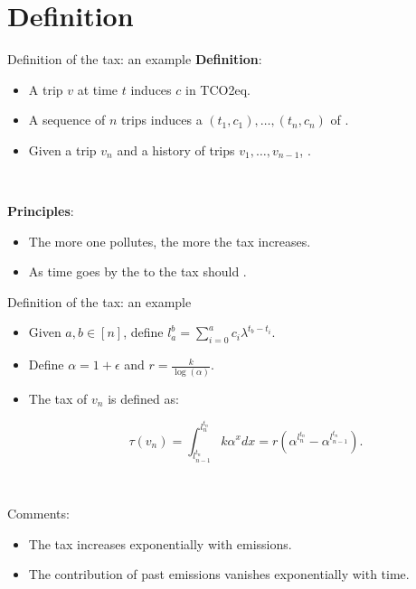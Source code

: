 \documentclass[french, english]{beamer}
\begin{document}
\section{Definition}
\begin{frame}{Definition of the tax: an example}
\textbf{Definition}:
\begin{itemize}
\item A trip $v$ at time $t$ induces  $c$ in TCO2eq.
\item A sequence of $n$ trips induces a  $(t_1, c_1),\ldots,(t_n,c_n)$ of .
\item Given a trip $v_n$ and a history of trips $v_1,\ldots, v_{n-1}$, .  
\end{itemize}

\

\textbf{Principles}:
\begin{itemize}
\item The more one pollutes, the more the tax increases. 
\item As time goes by the  to the tax should .
\end{itemize}
\end{frame}


\begin{frame}{Definition of the tax: an example}
    \begin{itemize}
    \item Given $a,b \in [n]$, define $l_a^{b} = \sum_{i = 0}^a c_i \lambda^{t_b - t_i}$.
    \item Define $\alpha = 1 + \epsilon$ and $r = \frac{k}{\log(\alpha)}$.
    \item The tax of $v_n$ is defined as: \begin{tcolorbox}$$ \tau(v_n) = \int_{l_{n-1}^{t_n}}^{l_n^{t_n}} k \alpha^x dx = r (\alpha^{l_n^{t_n}} - \alpha^{l_{n - 1}^{t_n}}).$$\end{tcolorbox}
    \end{itemize}	
    
    \

   Comments:
   \begin{itemize}
   \item The tax increases exponentially with emissions.
   \item The contribution of past emissions vanishes exponentially with time.
   \end{itemize}

\end{frame}
\end{document}
